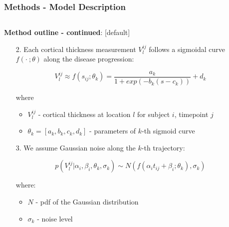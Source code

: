 \documentclass[8pt,xcolor=table]{beamer}
\begin{document}
\begin{frame}
\frametitle{Methods - Model Description}
\begin{columns}[T]
    \begin{column}{.7\textwidth}
    
   
    \textbf{Method outline - continued}:
    [default]
     \begin{enumerate}
  
      \item[2.] Each cortical thickness measurement $V_l^{ij}$ follows a sigmoidal curve $f(\cdot\ ;\theta)$ along the disease progression:
      
      $$ V_l^{ij} \approx f(s_{ij};\theta_k) = \frac{a_k}{1+exp(-b_k(s-c_k))} + d_k $$
      
      where
      \begin{itemize}
      \item  $V_l^{ij}$ - cortical thickness at location $l$ for subject $i$, timepoint $j$
       \item $\theta_k = [a_k, b_k, c_k, d_k]$ - parameters of $k$-th sigmoid curve
      \end{itemize}
      
      \vspace{2em}
      
      \item[3.] We assume Gaussian noise along the $k$-th trajectory:

      $$p(V_l^{ij} | \alpha_i, \beta_i, \theta_k, \sigma_k) \sim N(f(\alpha_i t_{ij} + \beta_i ; \theta_k), \sigma_k)$$
            
      where:
      \begin{itemize}
       \item $N$ - pdf of the Gaussian distribution
       \item $\sigma_k$ - noise level
       
      \end{itemize}
            
     \end{enumerate}
     

    \end{column}
    \hspace{-2em}
    \begin{column}{.25\textwidth}
    

\end{column}
\end{columns}
\end{frame}
\end{document}
